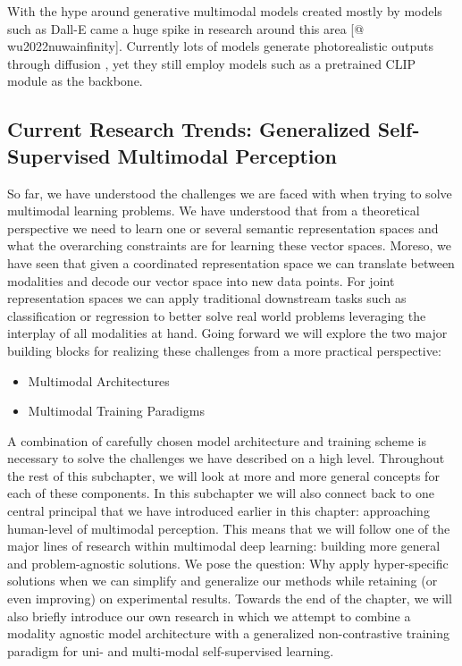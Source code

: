 \documentclass[
]{krantz}
\providecommand{\tightlist}{%
  \setlength{\itemsep}{0pt}\setlength{\parskip}{0pt}}
\begin{document}
With the hype around generative multimodal models created mostly by models such as Dall-E \citep{DBLP:conf/icml/RameshPGGVRCS21} came a huge spike in research around this area \citep{saharia2022photorealistic}{[}@ wu2022nuwainfinity{]}. Currently lots of models generate photorealistic outputs through diffusion \citep{DBLP:conf/nips/HoJA20}, yet they still employ models such as a pretrained CLIP \citep{DBLP:conf/icml/RadfordKHRGASAM21} module as the backbone.

\hypertarget{current-research-trends-generalized-self-supervised-multimodal-perception}{%
\subsection{Current Research Trends: Generalized Self-Supervised Multimodal Perception}\label{current-research-trends-generalized-self-supervised-multimodal-perception}}

So far, we have understood the challenges we are faced with when trying to solve multimodal learning problems. We have understood that from a theoretical perspective we need to learn one or several semantic representation spaces and what the overarching constraints are for learning these vector spaces. Moreso, we have seen that given a coordinated representation space we can translate between modalities and decode our vector space into new data points. For joint representation spaces we can apply traditional downstream tasks such as classification or regression to better solve real world problems leveraging the interplay of all modalities at hand.
Going forward we will explore the two major building blocks for realizing these challenges from a more practical perspective:

\begin{itemize}
\tightlist
\item
  Multimodal Architectures
\item
  Multimodal Training Paradigms
\end{itemize}

A combination of carefully chosen model architecture and training scheme is necessary to solve the challenges we have described on a high level. Throughout the rest of this subchapter, we will look at more and more general concepts for each of these components. In this subchapter we will also connect back to one central principal that we have introduced earlier in this chapter: approaching human-level of multimodal perception. This means that we will follow one of the major lines of research within multimodal deep learning: building more general and problem-agnostic solutions. We pose the question: Why apply hyper-specific solutions when we can simplify and generalize our methods while retaining (or even improving) on experimental results.
Towards the end of the chapter, we will also briefly introduce our own research in which we attempt to combine a modality agnostic model architecture with a generalized non-contrastive training paradigm for uni- and multi-modal self-supervised learning.
\end{document}
